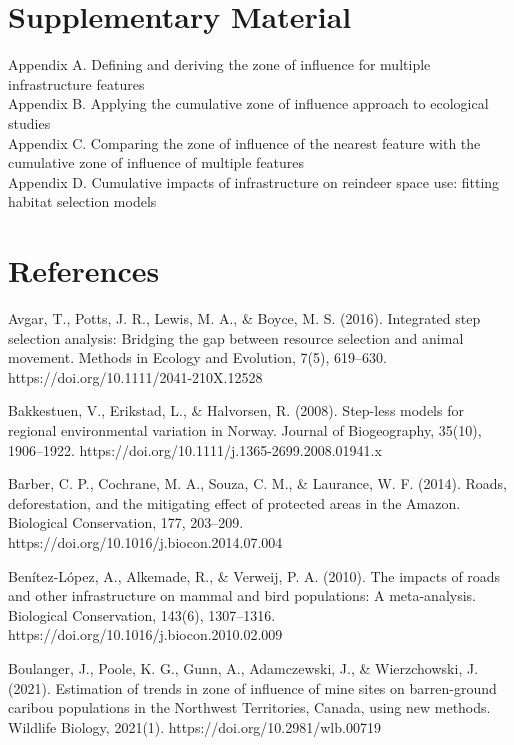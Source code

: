 \documentclass[titlepage]{article}
\begin{document}
\section*{Supplementary Material}

Appendix A. Defining and deriving the zone of influence for multiple infrastructure features \\
Appendix B. Applying the cumulative zone of influence approach to ecological studies \\
Appendix C. Comparing the zone of influence of the nearest feature with the cumulative zone of influence of multiple features \\ 
Appendix D. Cumulative impacts of infrastructure on reindeer space use: fitting habitat selection models


%

\section*{References}

Avgar, T., Potts, J. R., Lewis, M. A., & Boyce, M. S. (2016). Integrated step selection analysis: Bridging the gap between resource selection and animal movement. Methods in Ecology and Evolution, 7(5), 619–630. https://doi.org/10.1111/2041-210X.12528

Bakkestuen, V., Erikstad, L., & Halvorsen, R. (2008). Step-less models for regional environmental variation in Norway. Journal of Biogeography, 35(10), 1906–1922. https://doi.org/10.1111/j.1365-2699.2008.01941.x

Barber, C. P., Cochrane, M. A., Souza, C. M., & Laurance, W. F. (2014). Roads, deforestation, and the mitigating effect of protected areas in the Amazon. Biological Conservation, 177, 203–209. \\  https://doi.org/10.1016/j.biocon.2014.07.004

Benítez-López, A., Alkemade, R., & Verweij, P. A. (2010). The impacts of roads and other infrastructure on mammal and bird populations: A meta-analysis. Biological Conservation, 143(6), 1307–1316.\\ https://doi.org/10.1016/j.biocon.2010.02.009

Boulanger, J., Poole, K. G., Gunn, A., Adamczewski, J., & Wierzchowski, J. (2021). Estimation of trends in zone of influence of mine sites on barren-ground caribou populations in the Northwest Territories, Canada, using new methods. Wildlife Biology, 2021(1). https://doi.org/10.2981/wlb.00719
\end{document}
